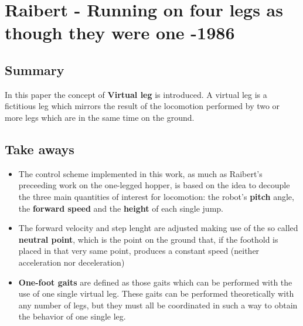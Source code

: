 \section{Raibert - Running on four legs as though they were one -1986}

\subsection*{Summary}

In this paper the concept of \textbf{Virtual leg} is introduced. A virtual leg is a fictitious leg which mirrors the result of the locomotion performed by two or more legs which are in the same time on the ground.

\subsection*{Take aways}

\begin{itemize}
\item The control scheme implemented in this work, as much as Raibert's preceeding work on the one-legged hopper, is based on the idea to decouple the three main quantities of interest for locomotion: the robot's \textbf{pitch} angle, the \textbf{forward speed} and the \textbf{height} of each single jump.

\item The forward velocity and step lenght are adjusted making use of the so called \textbf{neutral point}, which is the point on the ground that, if the foothold is placed in that very same point, produces a constant speed (neither acceleration nor deceleration)

\item \textbf{One-foot gaits} are defined as those gaits which can be performed with the use of one single virtual leg. These gaits can be performed theoretically with any number of legs, but they must all be coordinated in such a way to obtain the behavior of one single leg.
\end{itemize}